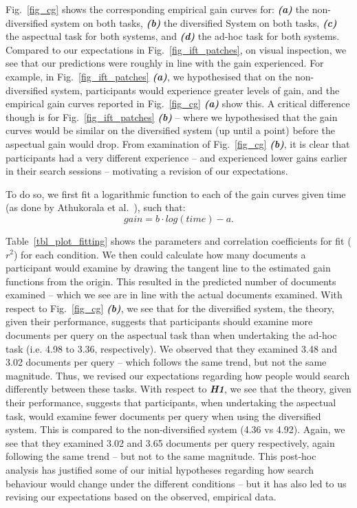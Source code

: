 Fig.~\ref{fig_cg} shows the corresponding empirical gain curves for: \textit{\textbf{(a)}} the non-diversified system on both tasks, \textit{\textbf{(b)}} the diversified System on both tasks, \textit{\textbf{(c)}} the aspectual task for both systems, and \textit{\textbf{(d)}} the ad-hoc task for both systems. Compared to our expectations in Fig.~\ref{fig_ift_patches}, on visual inspection, we see that our predictions were roughly in line with the gain experienced. For example, in Fig.~\ref{fig_ift_patches} \textit{\textbf{(a)}}, we hypothesised that on the non-diversified system, participants would experience greater levels of gain, and the empirical gain curves reported in Fig.~\ref{fig_cg} \emph{\textbf{(a)}} show this. A critical difference though is for Fig.~\ref{fig_ift_patches} \textit{\textbf{(b)}} -- where we hypothesised that the gain curves would be similar on the diversified system (up until a point) before the aspectual gain would drop. From examination of Fig.~\ref{fig_cg} \textit{\textbf{(b)}}, it is clear that participants had a very different experience -- and experienced lower gains earlier in their search sessions -- motivating a revision of our expectations.

To do so, we first fit a logarithmic function to each of the gain curves given time (as done by Athukorala et al.~\cite{ath2014ift}), such that:
\begin{equation}
gain = b \cdot log(time) - a.
\end{equation}

Table~\ref{tbl_plot_fitting} shows the parameters and correlation coefficients for fit ($r^2$) for each condition. We then could calculate how many documents a participant would examine by drawing the tangent line to the estimated gain functions from the origin. This resulted in the predicted number of documents examined -- which we see are in line with the actual documents examined. With respect to Fig.~\ref{fig_cg} \textit{\textbf{(b)}}, we see that for the diversified system, the theory, given their performance, suggests that participants should examine more documents per query on the aspectual task than when undertaking the ad-hoc task (i.e. 4.98 to 3.36, respectively). We observed that they examined 3.48 and 3.02 documents per query -- which follows the same trend, but not the same magnitude. Thus, we revised our expectations regarding how people would search differently between these tasks. With respect to \textit{\textbf{H1}}, we see that the theory, given their performance, suggests that participants, when undertaking the aspectual task, would examine fewer documents per query when using the diversified system. This is compared to the non-diversified system (4.36 vs 4.92). Again, we see that they examined 3.02 and 3.65 documents per query respectively, again following the same trend -- but not to the same magnitude. This post-hoc analysis has justified some of our initial hypotheses regarding how search behaviour would change under the different conditions -- but it has also led to us revising our expectations based on the observed, empirical data.


